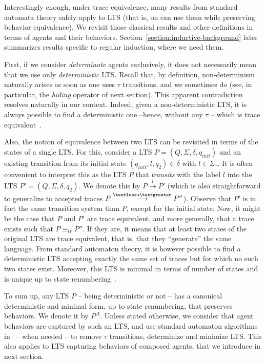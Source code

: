Interestingly enough, under trace equivalence, many results from standard automata theory safely apply to LTS (that is, on can use them while preserving behavior equivalence). We revisit those classical results and other definitions in terms of agents and their behaviors. Section~\ref{section:inductive-background} later summarizes results specific to regular induction, where we need them. 

First, if we consider \emph{determinate} agents exclusively, it does not necessarily mean that we use only \emph{deterministic} LTS. Recall that, by definition, non-determinism naturally arises as soon as one uses $\tau$ transitions, and we sometimes do (see, in particular, the \emph{hiding} operator of next section). This apparent contradiction resolves naturally in our context. Indeed, given a non-deterministic LTS, it is always possible to find a deterministic one --hence, without any $\tau$ -- which is trace equivalent~\cite{Hopcroft:1979}.

Also, the notion of equivalence between two LTS can be revisited in terms of the states of a single LTS. For this, consider a LTS $P = (Q,\Sigma,\delta,q_{init})$ and an existing transition from its initial state $(q_{init},l,q_2) \in \delta$ with $l \in \Sigma_{\tau}$. It is often convenient to interpret this as the LTS $P$ that \emph{transits} with the label $l$ into the LTS $P' = (Q,\Sigma,\delta,q_{2})$. We denote this by $P \stackrel{l}{\longrightarrow} P'$ (which is also straightforward to generalize to accepted traces $P \stackrel{\textless s \textgreater}{\longrightarrow} P''$).  Observe that $P'$ is in fact the same transition system than $P$, except for the initial state. Now, it might be the case that $P$ and $P'$ are trace equivalent, and more generally, that a trace exists such that $P \equiv_{tr} P''$. If they are, it means that at least two states of the original LTS are trace equivalent, that is, that they ``generate'' the same language. From standard automaton theory, it is however possible to find a deterministic LTS accepting exactly the same set of traces but for which no such two states exist. Moreover, this LTS is minimal in terms of number of states and is unique up to state renumbering~\cite{Gold:1978}.

To sum up, any LTS $P$ -- being deterministic or not -- has a canonical deterministic and minimal form, up to state renumbering, that preserves behaviors. We denote it by $P^{\Delta}$. Unless stated otherwise, we consider that agent behaviors are captured by such an LTS, and use standard automaton algorithms in~\cite{Hopcroft:1979} -- when needed -- to remove $\tau$ transitions, determinize and minimize LTS. This also applies to LTS capturing behaviors of composed agents, that we introduce in next section. 

